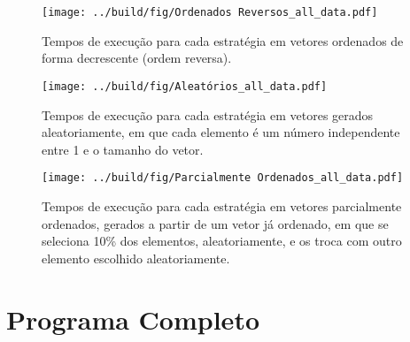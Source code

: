 \documentclass[10pt,oneside,onecolumn]{article}
\begin{document}
\begin{figure}[H]
	\centering
	\texttt{[image: ../build/fig/Ordenados Reversos\_all\_data.pdf]}
	\captionsetup{skip=0pt} %
	\caption{Tempos de execução para cada estratégia em vetores ordenados de
	forma decrescente (ordem reversa).}
	\label{fig:rev}
\end{figure}

\begin{figure}[H]
	\centering
	\texttt{[image: ../build/fig/Aleatórios\_all\_data.pdf]}
	\captionsetup{skip=0pt} %
	\caption{Tempos de execução para cada estratégia em vetores gerados
	aleatoriamente, em que cada elemento é um número independente entre 1 e o
	tamanho do vetor.}
	\label{fig:rand}
\end{figure}

\begin{figure}[H]
	\centering
	\texttt{[image: ../build/fig/Parcialmente Ordenados\_all\_data.pdf]}
	\captionsetup{skip=0pt} %
	\caption{Tempos de execução para cada estratégia em vetores parcialmente
	ordenados, gerados a partir de um vetor já ordenado, em que se seleciona
	10\% dos elementos, aleatoriamente, e os troca com outro elemento escolhido
	aleatoriamente.}
	\label{fig:part}
\end{figure}


\newpage
\appendix
\section{Programa Completo}\label{apx:codigo}

\newpage {}
\newpage {}
\newpage {}
\newpage {}

\end{document}
